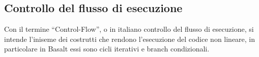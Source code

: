 \subsection{Controllo del flusso di esecuzione}
Con il termine “Control-Flow”, o in italiano controllo del flusso di esecuzione, si intende l’iniseme dei costrutti che rendono 
l’esecuzione del codice non lineare, in particolare in Basalt essi sono cicli iterativi e branch condizionali. 

 \newpage
 \newpage
 \newpage
